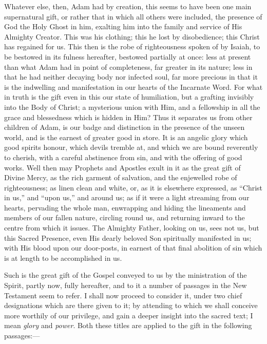 Whatever else, then, Adam had by creation, this seems to have been
one main supernatural gift, or rather that in which all others were
included, the presence of God the Holy Ghost in him, exalting him into
the family and service of His Almighty Creator. This was his clothing;
this he lost by disobedience; this Christ has regained for us. This
then is the robe of righteousness spoken of by Isaiah, to be bestowed
in its fulness hereafter, bestowed partially at once: less at present
than what Adam had in point of completeness, far greater in its
nature; less in that he had neither decaying body nor infected soul,
far more precious in that it is the indwelling and manifestation in
our hearts of the Incarnate Word. For what in truth is the gift even
in this our state of humiliation, but a grafting invisibly into the
Body of Christ; a mysterious union with Him, and a fellowship in all
the grace and blessedness which is hidden in Him? Thus it separates us
from other children of Adam, is our badge and distinction in the
presence of the unseen world, and is the earnest of greater good
in store. It is an angelic glory which good spirits honour, which
devils tremble at, and which we are bound reverently to cherish, with
a careful abstinence from sin, and with the offering of good works.
Well then may Prophets and Apostles exult in it as the great gift of
Divine Mercy, as the rich garment of salvation, and the enjewelled
robe of righteousness; as linen clean and white, or, as it is
elsewhere expressed, as ``Christ in us,'' and ``upon
us,'' and around us; as if it were a light streaming from our
hearts, pervading the whole man, enwrapping and hiding the lineaments
and members of our fallen nature, circling round us, and returning
inward to the centre from which it issues. The Almighty Father,
looking on us, sees not us, but this Sacred Presence, even His dearly
beloved Son spiritually manifested in us; with His blood upon our
door-posts, in earnest of that final abolition of sin which is at
length to be accomplished in us.

Such is the great gift of the Gospel conveyed to us by the
ministration of the Spirit, partly now, fully hereafter, and to it a
number of passages in the New Testament seem to refer. I shall now
proceed to consider it, under two chief designations which are there
given to it; by attending to which we shall conceive more worthily of
our privilege, and gain a deeper insight into the sacred text; I mean \emph{glory}
and \emph{power}. Both these titles are applied to the gift in the
following passages:—

